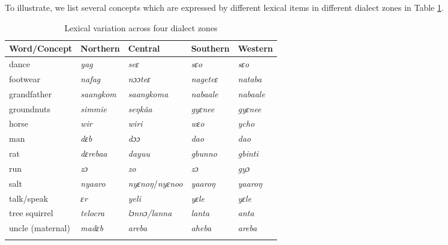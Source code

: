 \begin{refsection}
To illustrate, we list several concepts which are expressed by different lexical items in different dialect zones in Table \ref{tab:dialects}.

\begin{table}
    \begin{tabularx}{\textwidth}{Xllll}\\
    \lsptoprule 
    Word/Concept & Northern & Central & Southern & Western \\\hline
    dance    &\textit{yag} &\textit{seɛ}  & \textit{sɛo}&\textit{sɛo} \\
    footwear    &\textit{nafag} &\textit{nɔɔteɛ}  & \textit{nageteɛ}&\textit{nataba} \\
    grandfather    &\textit{saangkom} &\textit{saangkoma}  & \textit{nabaale}&\textit{nabaale} \\
    groundnuts    &\textit{simmie} &\textit{seŋkãa}& \textit{gyɛnee}&\textit{gyɛnee} \\
    horse    &\textit{wir} &\textit{wiri}  & \textit{wɛo}&\textit{ycho} \\
    man    &\textit{dɛb} &\textit{dɔɔ}  & \textit{dao}&\textit{dao} \\
    rat    &\textit{dɛrebaa} &\textit{dayuu}  & \textit{gbunno}&\textit{gbinti} \\
    run    &\textit{zɔ} &\textit{zo}  & \textit{zɔ}&\textit{gyɔ} \\
    salt  & \textit{nyaaro} &  \textit{nyɛnoŋ}/\textit{nyɛnoo}& \textit{yaaroŋ}     & \textit{yaaroŋ}  \\
    talk/speak    &\textit{ɛr} &\textit{yeli}  & \textit{yɛle}&\textit{yɛle} \\
    tree squirrel    &\textit{telocra} &\textit{lɔnnɔ/lanna}  & \textit{lanta}&\textit{anta} \\
    uncle (maternal)    &\textit{madɛb} &\textit{areba}  & \textit{aheba}&\textit{areba} \\
    \lspbottomrule
    \end{tabularx}
    \caption{Lexical variation across four dialect zones}
    \label{tab:dialects}
\end{table}

    
    
     

   




\end{refsection}
